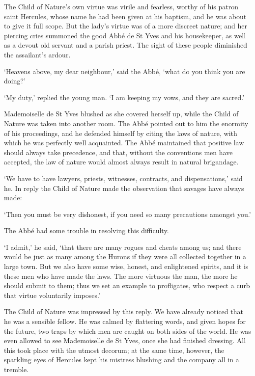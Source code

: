 \documentclass{article}
\begin{document}
\begin{center}
The Child of Nature's own virtue was virile and fearless, worthy of his patron 
saint Hercules, whose name he had been given at his baptism, and he was about to 
give it full scope. But the lady's virtue was of a more discreet nature; and her 
piercing cries summoned the good Abbé de St Yves and his housekeeper, as well 
as a devout old servant and a parish priest. The sight of these people diminished 
the assailant's ardour. 

`Heavens above, my dear neighbour,' said the Abbé, `what do you think you are 
doing?' 

`My duty,' replied the young man. `I am keeping my vows, and they are sacred.' 

Mademoiselle de St Yves blushed as she covered herself up, while the Child of Nature 
was taken into another room. The Abbé pointed out to him the enormity of his proceedings, 
and he defended himself by citing the laws of nature, with which he was perfectly 
well acquainted. The Abbé maintained that positive law should always take precedence, 
and that, without the conventions men have accepted, the law of nature would almost 
always result in natural brigandage. 

`We have to have lawyers, priests, witnesses, contracts, and dispensations,' said 
he. In reply the Child of Nature made the observation that savages have always 
made: 

`Then you must be very dishonest, if you need so many precautions amongst you.' 

The Abbé had some trouble in resolving this difficulty. 

`I admit,' he said, `that there are many rogues and cheats among us; and there 
would be just as many among the Hurons if they were all collected together in a 
large town. But we also have some wise, honest, and enlightened spirits, and it 
is these men who have made the laws. The more virtuous the man, the more he should 
submit to them; thus we set an example to profligates, who respect a curb that 
virtue voluntarily imposes.' 

The Child of Nature was impressed by this reply. We have already noticed that he 
was a sensible fellow. He was calmed by flattering words, and given hopes for the 
future, two traps by which men are caught on both sides of the world. He was even 
allowed to see Mademoiselle de St Yves, once she had finished dressing. All this 
took place with the utmost decorum; at the same time, however, the sparkling eyes 
of Hercules kept his mistress blushing and the company all in a tremble. 


\end{center}
\end{document}
